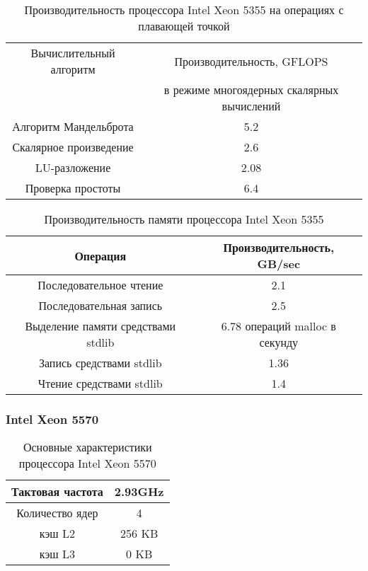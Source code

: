 \begin{table}[ht]
	\begin{center}
		\caption{Производительность процессора Intel Xeon  5355 на операциях с плавающей точкой}
		\begin{tabular}{|c|c|}
			\hline	
			Вычислительный алгоритм &  Производительность, GFLOPS \\ 
			& в режиме многоядерных скалярных вычислений \\ \hline
			Алгоритм Мандельброта  &  5.2 	\\ \hline
			Скалярное произведение &  2.6   \\ \hline
			LU-разложение          &  2.08   \\ \hline
			Проверка простоты      &  6.4  \\ \hline 
			
			
		\end{tabular}
	\end{center} 	
\end{table} 	

\begin{table}[ht]
	\begin{center}
		\caption{Производительность памяти процессора Intel Xeon 5355}
		\begin{tabular}{|c|c|}
			\hline	
			Операция  &  Производительность, GB/sec \\ \hline
			Последовательное чтение &  2.1 	\\  \hline
			Последовательная запись &  2.5   \\  \hline
			Выделение памяти средствами stdlib &  6.78 операций malloc в секунду  \\  \hline
			Запись средствами stdlib  & 1.36  \\ \hline
			Чтение средствами stdlib  & 1.4 \\ \hline 
		\end{tabular}
	\end{center} 	
\end{table} 	

\clearpage
\subsubsection{Intel Xeon 5570}

\begin{table}[ht]
	\begin{center}
		\caption{Основные характеристики процессора Intel Xeon  5570}
		\begin{tabular}{|c|c|}
			\hline	
			Тактовая частота & 2.93GHz   \\ \hline
			Количество ядер & 4 	     \\ \hline
			кэш L2         &  256 KB      \\ \hline
			кэш L3         &  0 KB        \\ \hline
		\end{tabular}
	\end{center} 	
\end{table} 	

